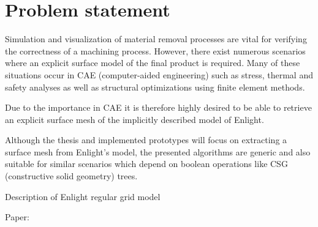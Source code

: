 
\section{Problem statement}


Simulation and visualization of material removal processes are vital for verifying the correctness of a machining process. However, there exist numerous scenarios where an explicit surface model of the final product is required. Many of these situations occur in CAE (computer-aided engineering) such as stress, thermal and safety analyses as well as structural optimizations using finite element methods.

Due to the importance in CAE it is therefore highly desired to be able to retrieve an explicit surface mesh of the implicitly described model of Enlight.



Although the thesis and implemented prototypes will focus on extracting a surface mesh from Enlight's model, the presented algorithms are generic and also suitable for similar scenarios which depend on boolean operations like CSG (constructive solid geometry) trees.

Description of Enlight regular grid model

Paper: \cite{enlight}